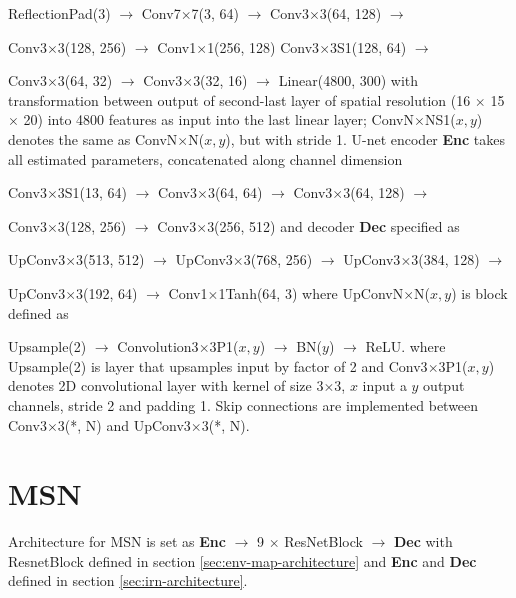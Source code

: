 ReflectionPad(3) $\to$ Conv7$\times$7(3, 64) $\to$ Conv3$\times$3(64, 128) $\to$

Conv3$\times$3(128, 256) $\to$ Conv1$\times$1(256, 128) Conv3$\times$3S1(128, 64) $\to$

Conv3$\times$3(64, 32) $\to$ Conv3$\times$3(32, 16) $\to$ Linear(4800, 300)
\newline
\newline
with transformation between output of second-last layer of spatial resolution (16 $\times$ 15 $\times$ 20) into 4800 features as input into the last linear layer; ConvN$\times$NS1($x, y$) denotes the same as ConvN$\times$N($x, y$), but with stride 1.
\newline
U-net encoder \textbf{Enc} takes all estimated parameters, concatenated along channel dimension 
\newline

Conv3$\times$3S1(13, 64) $\to$ Conv3$\times$3(64, 64) $\to$ Conv3$\times$3(64, 128) $\to$

Conv3$\times$3(128, 256) $\to$ Conv3$\times$3(256, 512)
\newline
\newline
and decoder \textbf{Dec} specified as
\newline

UpConv3$\times$3(513, 512) $\to$ UpConv3$\times$3(768, 256) $\to$ UpConv3$\times$3(384, 128) $\to$

UpConv3$\times$3(192, 64) $\to$ Conv1$\times$1Tanh(64, 3)
\newline
\newline
where UpConvN$\times$N($x, y$) is block defined as
\newline

Upsample(2) $\to$ Convolution3$\times$3P1($x, y$) $\to$ BN($y$) $\to$ ReLU.
\newline
\newline
where Upsample(2) is layer that upsamples input by factor of 2 and Conv3$\times$3P1($x, y$) denotes 2D convolutional layer with kernel of size 3$\times$3, $x$ input a $y$ output channels, stride 2 and padding 1.
Skip connections are implemented between Conv3$\times$3(*, N) and UpConv3$\times$3(*, N).
\section{MSN}
\label{sec:msn-architecture}
Architecture for MSN is set as \;\; \textbf{Enc} $\to$ 9 $\times$ ResNetBlock $\to$ \textbf{Dec} \;\;
with ResnetBlock defined in section \ref{sec:env-map-architecture} and \textbf{Enc} and \textbf{Dec} defined in section \ref{sec:irn-architecture}.